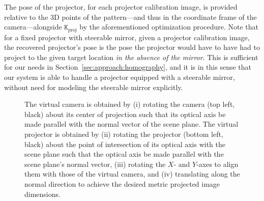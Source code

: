 \documentclass[review]{elsarticle}
\begin{document}
{The pose of the projector, for each projector calibration image, is provided relative to the 3D points of the pattern---and thus in the coordinate frame of the camera---alongside $\mathtt{K}_\text{proj}$ by the aforementioned optimization procedure. Note that for a fixed projector with steerable mirror, given a projector calibration image, the recovered projector's pose is the pose the projector would have to have had to project to the given target location \textit{in the absence of the mirror}. This is sufficient for our needs in Section~\ref{sec:approach:homography}, and it is in this sense that our system is able to handle a projector equipped with a steerable mirror, without need for modeling the steerable mirror explicitly.

\begin{figure}
    \centering
    \qquad
    \caption{The virtual camera is obtained by (i) rotating the camera (top left, black) about its center of projection such that its optical axis be made parallel with the normal vector of the scene plane. The virtual projector is obtained by (ii) rotating the projector (bottom left, black) about the point of intersection of its optical axis with the scene plane such that the optical axis be made parallel with the scene plane's normal vector, (iii) rotating the $X$- and $Y$-axes to align them with those of the virtual camera, and (iv) translating along the normal direction to achieve the desired metric projected image dimensions.} %
    \label{fig:virtualproj}
\end{figure}

}
\end{document}
